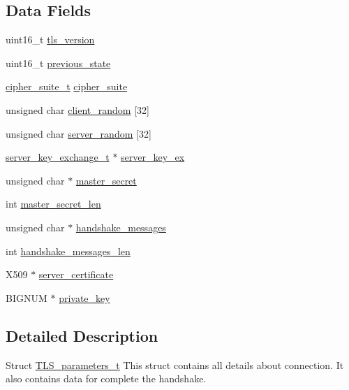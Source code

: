 \subsection*{Data Fields}
\begin{DoxyCompactItemize}
\item 
uint16\+\_\+t \hyperlink{struct_t_l_s__parameters__t_a8fd63193690a09b75e0aaf9b971ed3df}{tls\+\_\+version}
\item 
uint16\+\_\+t \hyperlink{struct_t_l_s__parameters__t_a7876cd7f12771bb13dfd180e2d74e02b}{previous\+\_\+state}
\item 
\hyperlink{structcipher__suite__t}{cipher\+\_\+suite\+\_\+t} \hyperlink{struct_t_l_s__parameters__t_af1d8ebe57a775be2b91550dbcacb2a58}{cipher\+\_\+suite}
\item 
unsigned char \hyperlink{struct_t_l_s__parameters__t_adbdca8d573a8e073ef16bf14229fb4c9}{client\+\_\+random} \mbox{[}32\mbox{]}
\item 
unsigned char \hyperlink{struct_t_l_s__parameters__t_a9159f146fbc286a8b55f4aa83396ae2f}{server\+\_\+random} \mbox{[}32\mbox{]}
\item 
\hyperlink{_server_client_key_exchange_8h_a0e7e73056ef40d5a7b303b385dee59cd}{server\+\_\+key\+\_\+exchange\+\_\+t} $\ast$ \hyperlink{struct_t_l_s__parameters__t_ad79527a4a6a3547cc16f0fb569767d9d}{server\+\_\+key\+\_\+ex}
\item 
unsigned char $\ast$ \hyperlink{struct_t_l_s__parameters__t_a68c2015df5cb7259aa1abdee33c8e6f3}{master\+\_\+secret}
\item 
int \hyperlink{struct_t_l_s__parameters__t_a7112487b636ca7921055d94ae02478fe}{master\+\_\+secret\+\_\+len}
\item 
unsigned char $\ast$ \hyperlink{struct_t_l_s__parameters__t_ac6734c87e703c22f7d34f71ca116d005}{handshake\+\_\+messages}
\item 
int \hyperlink{struct_t_l_s__parameters__t_afbdbb7d32255aef8951f95ccc44957fc}{handshake\+\_\+messages\+\_\+len}
\item 
X509 $\ast$ \hyperlink{struct_t_l_s__parameters__t_a832ae425d6bb6330e1e5e825ab85ac31}{server\+\_\+certificate}
\item 
B\+I\+G\+N\+UM $\ast$ \hyperlink{struct_t_l_s__parameters__t_aa7d109714bb4c1faa6aba18c0dd3dcae}{private\+\_\+key}
\end{DoxyCompactItemize}


\subsection{Detailed Description}
Struct \hyperlink{struct_t_l_s__parameters__t}{T\+L\+S\+\_\+parameters\+\_\+t} This struct contains all details about connection. It also contains data for complete the handshake. 

